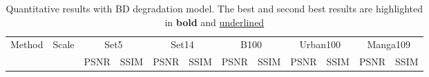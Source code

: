\documentclass[runningheads]{llncs}
\begin{document}
\begin{table}[t]
	\centering
	\scriptsize
	\caption{Quantitative results with BD degradation model. The best and second best results are highlighted in \textbf{bold} and \underline{underlined}}
	\begin{tabular}{|p{6.5em}|p{2.5em}|p{2.5em}|p{3em}|p{2.5em}|p{3em}|p{2.5em}|p{3em}|p{2.5em}|p{3em}|p{2.5em}|p{3em}|}
		
		\hline
		\multicolumn{1}{|c|}{\multirow{2}{*}{{ Method} }} & \multicolumn{1}{c|}{\multirow{2}{*}{Scale}} & \multicolumn{2}{c}{Set5} & \multicolumn{2}{c}{Set14} & \multicolumn{2}{c}{B100} & \multicolumn{2}{c}{Urban100} & \multicolumn{2}{c|}{ Manga109} \\
		\cline{3-12}  &  &  PSNR  & SSIM  & PSNR   & SSIM  & PSNR  & SSIM  & PSNR  & SSIM  & PSNR  & SSIM \\
		\hline
		

\end{tabular}
\end{table}
\end{document}
